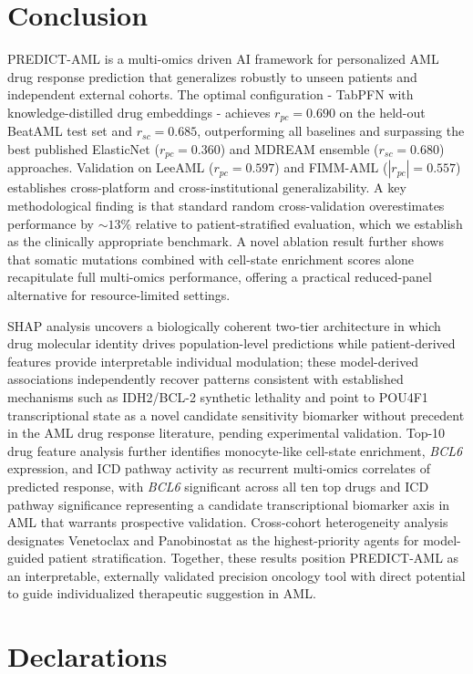 \documentclass[pdflatex,sn-mathphys-num]{sn-jnl}
\theoremstyle{thmstyleone}
\theoremstyle{thmstyletwo}
\theoremstyle{thmstylethree}
\begin{document}
\section{Conclusion}\label{sec5}
PREDICT-AML is a multi-omics driven AI framework for personalized AML drug response prediction that generalizes robustly to unseen patients and independent external cohorts. The optimal configuration - TabPFN with knowledge-distilled drug embeddings - achieves $r_{pc} = 0.690$ on the held-out BeatAML test set and $r_{sc} = 0.685$, outperforming all baselines and surpassing the best published ElasticNet ($r_{pc} = 0.360$) and MDREAM ensemble ($r_{sc} = 0.680$) approaches. Validation on LeeAML ($r_{pc} = 0.597$) and FIMM-AML ($|r_{pc}| = 0.557$) establishes cross-platform and cross-institutional generalizability. A key methodological finding is that standard random cross-validation overestimates performance by $\sim\!13\%$ relative to patient-stratified evaluation, which we establish as the clinically appropriate benchmark. A novel ablation result further shows that somatic mutations combined with cell-state enrichment scores alone recapitulate full multi-omics performance, offering a practical reduced-panel alternative for resource-limited settings.

SHAP analysis uncovers a biologically coherent two-tier architecture in which drug molecular identity drives population-level predictions while patient-derived features provide interpretable individual modulation; these model-derived associations independently recover patterns consistent with established mechanisms such as IDH2/BCL-2 synthetic lethality and point to POU4F1 transcriptional state as a novel candidate sensitivity biomarker without precedent in the AML drug response literature, pending experimental validation. Top-10 drug feature analysis further identifies monocyte-like cell-state enrichment, \textit{BCL6} expression, and ICD pathway activity as recurrent multi-omics correlates of predicted response, with \textit{BCL6} significant across all ten top drugs and ICD pathway significance representing a candidate transcriptional biomarker axis in AML that warrants prospective validation. Cross-cohort heterogeneity analysis designates Venetoclax and Panobinostat as the highest-priority agents for model-guided patient stratification. Together, these results position PREDICT-AML as an interpretable, externally validated precision oncology tool with direct potential to guide individualized therapeutic suggestion in AML.

\section*{Declarations}
\end{document}
